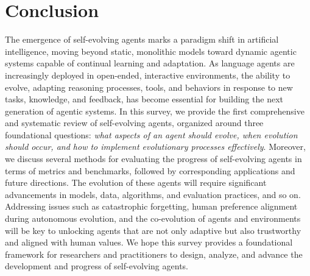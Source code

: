 \section{Conclusion}

The emergence of self-evolving agents marks a paradigm shift in artificial intelligence, moving beyond static, monolithic models toward dynamic agentic systems capable of continual learning and adaptation. As language agents are increasingly deployed in open-ended, interactive environments, the ability to evolve, adapting reasoning processes, tools, and behaviors in response to new tasks, knowledge, and feedback, has become essential for building the next generation of agentic systems. In this survey, we provide the first comprehensive and systematic review of self-evolving agents, organized around three foundational questions: \textit{what aspects of an agent should evolve, when evolution should occur, and how to implement evolutionary processes effectively}. Moreover, we discuss several methods for evaluating the progress of self-evolving agents in terms of metrics and benchmarks, followed by corresponding applications and future directions. 
The evolution of these agents will require significant advancements in models, data, algorithms, and evaluation practices, and so on.  Addressing issues such as catastrophic forgetting, human preference alignment during autonomous evolution, and the co-evolution of agents and environments will be key to unlocking agents that are not only adaptive but also trustworthy and aligned with human values. We hope this survey provides a foundational framework for researchers and practitioners to design, analyze, and advance the development and progress of self-evolving agents.

